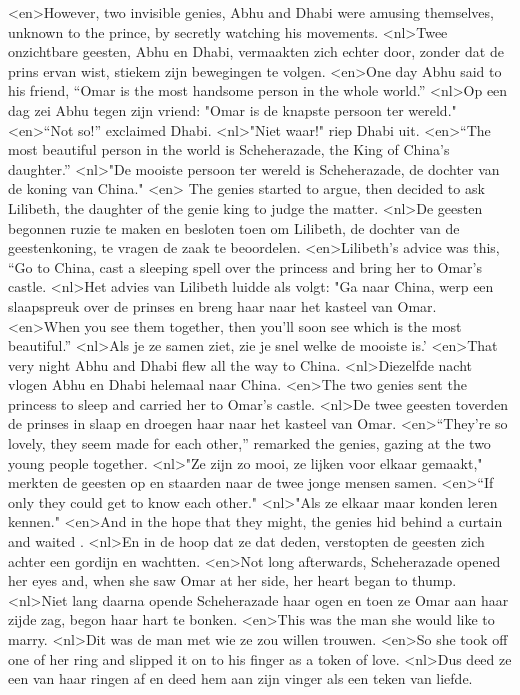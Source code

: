 <en>However, two invisible genies, Abhu and Dhabi were amusing themselves, unknown to the prince, by secretly watching his movements.
<nl>Twee onzichtbare geesten, Abhu en Dhabi, vermaakten zich echter door, zonder dat  de prins ervan wist,  stiekem  zijn bewegingen te volgen.
<en>One day Abhu said to his friend, “Omar is the most handsome person in the whole world.”
<nl>Op een dag zei Abhu tegen zijn vriend: "Omar is de knapste persoon ter wereld."
<en>“Not so!” exclaimed Dhabi.
<nl>"Niet waar!" riep Dhabi uit.
<en>“The most beautiful person in the world is Scheherazade, the King of China’s daughter.”
<nl>"De mooiste persoon ter wereld is Scheherazade, de dochter van de koning van China." 
<en> The genies started to argue, then decided to ask Lilibeth, the daughter of the genie king to judge the matter.
<nl>De geesten begonnen ruzie te maken en besloten toen om Lilibeth, de dochter van de geestenkoning, te vragen de zaak te beoordelen.
<en>Lilibeth’s advice was this, “Go to China, cast a sleeping spell over the princess and bring her to Omar’s castle.
<nl>Het advies van Lilibeth luidde als volgt: "Ga naar China, werp een slaapspreuk over de prinses en breng haar naar het kasteel van Omar.
<en>When you see them together, then you’ll soon see which is the most beautiful.” 
<nl>Als je ze samen ziet, zie je snel welke de mooiste is.'
<en>That very night Abhu and Dhabi flew all the way to China.
<nl>Diezelfde nacht vlogen Abhu en Dhabi helemaal naar China.
<en>The two genies sent the princess to sleep and carried her to Omar’s castle.
<nl>De twee geesten toverden de prinses in slaap en droegen haar naar het kasteel van Omar.
<en>“They’re so lovely, they seem made for each other,” remarked the genies, gazing at the two young people together.
<nl>"Ze zijn zo mooi, ze lijken voor elkaar gemaakt," merkten de geesten op en staarden  naar de twee jonge mensen samen.
<en>“If only they could get to know each other."
<nl>"Als ze elkaar maar konden leren kennen."
<en>And in the hope that they might, the genies hid behind a curtain and waited .
<nl>En in de hoop dat ze dat deden, verstopten de geesten zich achter een gordijn en wachtten.
<en>Not long afterwards, Scheherazade opened her eyes and, when she saw Omar at her side, her heart began to thump.
<nl>Niet lang daarna opende Scheherazade haar ogen en toen ze Omar aan haar zijde zag, begon haar hart te bonken.
<en>This was the man she would like to marry.
<nl>Dit was de man met wie ze zou willen trouwen.
<en>So she took off one of her ring and slipped it on to his finger as a token of love.
<nl>Dus deed ze een van haar ringen af en deed hem aan zijn vinger als een teken van liefde.

